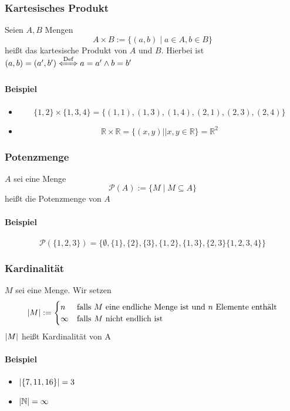 \documentclass[a4paper]{scrartcl}
\DeclarePairedDelimiter\abs{\lvert}{\rvert}%
\theoremstyle{definition}
\theoremstyle{plain}
\theoremstyle{plain}
\theoremstyle{remark}
\theoremstyle{remark}
\theoremstyle{remark}
\theoremstyle{remark}
\theoremstyle{remark}
\begin{document}
\subsubsection{Kartesisches Produkt}
\label{sec-2-4-11}
Seien $A,B$ Mengen
\[A\times B := \{(a,b)\mid a\in A, b\in B\}\]
heißt das kartesische Produkt von $A$ und $B$. Hierbei ist $(a,b) = (a',b') \xLeftrightarrow{\text{Def}} a = a' \wedge b = b'$

\paragraph{Beispiel}
\label{sec-2-4-11-1}
\begin{itemize}
\item \[\{1,2\}\times \{1,3,4\} = \{(1,1),(1,3),(1,4),(2,1),(2,3),(2,4)\}\]
\item \[\mathbb{R}\times\mathbb{R}=\{(x,y)|\mid x,y \in \mathbb{R}\} = \mathbb{R}^2\]
\end{itemize}
\subsubsection{Potenzmenge}
\label{sec-2-4-12}
$A$ sei eine Menge
\[\mathcal{P} (A) := \{M\mid M\subseteq A\}\]
heißt die Potenzmenge von $A$
\paragraph{Beispiel}
\label{sec-2-4-12-1}
\[\mathcal{P} (\{1,2,3\}) =  \{\emptyset, \{1\}, \{2\},\{3\},\{1,2\},\{1,3\},\{2,3\}\{1,2,3,4\}\}\]
\subsubsection{Kardinalität}
\label{sec-2-4-13}
$M$ sei eine Menge. Wir setzen
\[\abs{M} := \begin{cases} n & \text{falls $M$ eine endliche Menge ist und $n$ Elemente enthält} \\ \infty & \text{falls $M$ nicht endlich ist} \end{cases}\]
$\abs{M}$ heißt Kardinalität von A
\paragraph{Beispiel}
\label{sec-2-4-13-1}
\begin{itemize}
\item $\abs{\{7,11,16\}} = 3$
\item $\abs{\mathbb{N}} = \infty$
\end{itemize}
\end{document}
